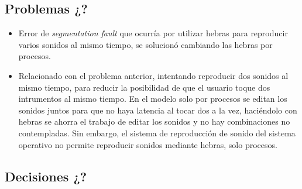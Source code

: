 \documentclass{article}
\begin{document}
 \subsection{Problemas ¿?}
 \begin{itemize}
     \item
        Error de \textit{segmentation fault} que ocurría por utilizar hebras para reproducir
        varios sonidos al mismo tiempo, se solucionó cambiando las hebras por procesos.
     \item
        Relacionado con el problema anterior, intentando reproducir dos sonidos al mismo tiempo, para reducir
        la posibilidad de que el usuario toque dos intrumentos al mismo tiempo. En el modelo solo por procesos
        se editan los sonidos juntos para que no haya latencia al tocar dos a la vez, haciéndolo con hebras se
        ahorra el trabajo de editar los sonidos y no hay combinaciones no contempladas. Sin embargo, el sistema
        de reproducción de sonido del sistema operativo no permite reproducir sonidos mediante hebras, solo
        procesos.
 \end{itemize}

 \subsection{Decisiones ¿?}
\end{document}
